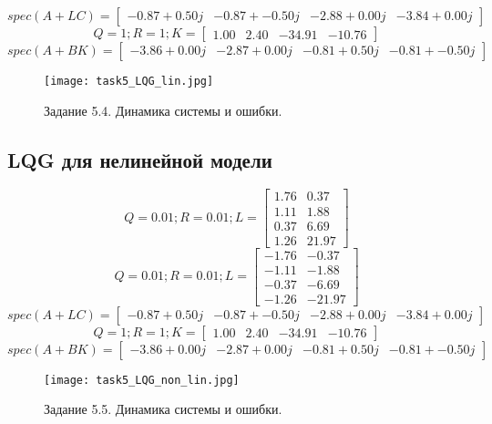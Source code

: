       \[spec(A+LC) = \begin{bmatrix}
        -0.87 + 0.50j & -0.87 + -0.50j & -2.88 + 0.00j & -3.84 + 0.00j
       \end{bmatrix}\]
       \[Q = 1; R = 1; K= \begin{bmatrix}
         1.00 &  2.40 & -34.91 & -10.76
       \end{bmatrix}\]
       \[spec(A + BK) = \begin{bmatrix}
        -3.86 + 0.00j & -2.87 + 0.00j & -0.81 + 0.50j & -0.81 + -0.50j
       \end{bmatrix}\]
\begin{figure}[]
        \centering
        \texttt{[image: task5\_LQG\_lin.jpg]}
        \caption{Задание 5.4. Динамика системы и ошибки.}
        \label{fig:task5_4}
\end{figure}


\subsection{ LQG для нелинейной модели}
\[Q = 0.01; R = 0.01; L = \begin{bmatrix}
        1.76 &  0.37\\
        1.11 &  1.88\\
        0.37 &  6.69\\
        1.26 &  21.97
      \end{bmatrix}\]
      \[Q = 0.01; R = 0.01; L = \begin{bmatrix}
       -1.76 & -0.37\\
       -1.11 & -1.88\\
       -0.37 & -6.69\\
       -1.26 & -21.97
      \end{bmatrix}\]
      \[spec(A+LC) = \begin{bmatrix}
       -0.87 + 0.50j & -0.87 + -0.50j & -2.88 + 0.00j & -3.84 + 0.00j
      \end{bmatrix}\]
      \[Q = 1; R = 1; K= \begin{bmatrix}
        1.00 &  2.40 & -34.91 & -10.76
      \end{bmatrix}\]
      \[spec(A + BK) = \begin{bmatrix}
       -3.86 + 0.00j & -2.87 + 0.00j & -0.81 + 0.50j & -0.81 + -0.50j
      \end{bmatrix}\]
\begin{figure}[]
        \centering
        \texttt{[image: task5\_LQG\_non\_lin.jpg]}
        \caption{Задание 5.5. Динамика системы и ошибки.}
        \label{fig:task5_5}
\end{figure}
\pagebreak

